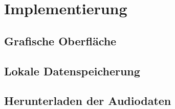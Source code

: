 \chapter{Implementierung}
\label{Kap5}

\section{Grafische Oberfläche}

\section{Lokale Datenspeicherung}

\section{Herunterladen der Audiodaten}
